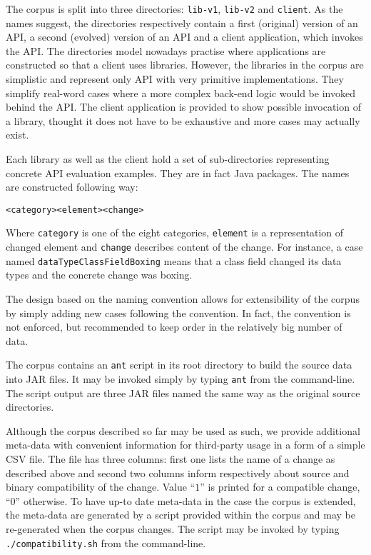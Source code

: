 \documentclass[conference]{IEEEtran}
\begin{document}
The corpus is split into three directories: \texttt{lib-v1}, \texttt{lib-v2} and \texttt{client}. As the names suggest, the directories respectively contain a first (original) version of an API, a second (evolved) version of an API and a client application, which invokes the API. The directories model nowadays practise where applications are constructed so that a client uses libraries. However, the libraries in the corpus are simplistic and represent only API with very primitive implementations. They simplify real-word cases where a more complex back-end logic would be invoked behind the API. The client application is provided to show possible invocation of a library, thought it does not have to be exhaustive and more cases may actually exist.

Each library as well as the client hold a set of sub-directories representing concrete API evaluation examples. They are in fact Java packages. The names are constructed following way:
\begin{verbatim}
<category><element><change>
\end{verbatim} 

Where \texttt{category} is one of the eight categories, \texttt{element} is a representation of changed element and \texttt{change} describes content of the change. For instance, a case named \texttt{dataTypeClassFieldBoxing} means that a class field changed its data types and the concrete change was boxing.

The design based on the naming convention allows for extensibility of the corpus by simply adding new cases following the convention. In fact, the convention is not enforced, but recommended to keep order in the relatively big number of data.

The corpus contains an \texttt{ant} script in its root directory to build the source data into JAR files. It may be invoked simply by typing \texttt{ant} from the command-line.  The script output are three JAR files named the same way as the original source directories.

Although the corpus described so far may be used as such, we provide additional meta-data with convenient information for third-party usage in a form of a simple CSV file. The file has three columns: first one lists the name of a change as described above and second two columns inform respectively about source and binary compatibility of the change. Value ``$1$'' is printed for a compatible change, ``$0$'' otherwise. To have up-to date meta-data in the case the corpus is extended, the meta-data are generated by a script provided within the corpus and may be re-generated when the corpus changes. The script may be invoked by typing \texttt{./compatibility.sh} from the command-line.
\end{document}
